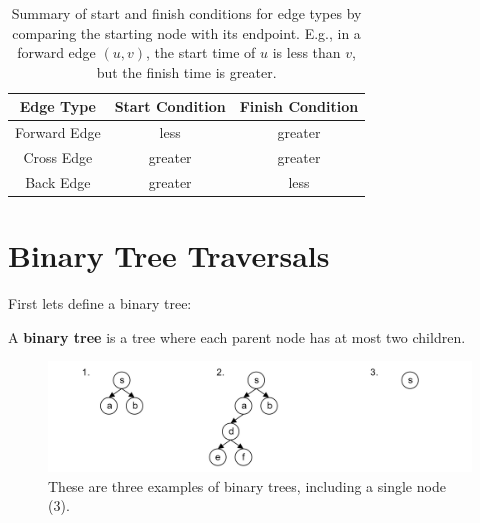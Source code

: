 \begin{table}[h]
    \centering
    \begin{tabular}{|c|c|c|}
        \hline
        \textbf{Edge Type} & \textbf{Start Condition} & \textbf{Finish Condition} \\ \hline
        Forward Edge & less & greater \\ \hline
        Cross Edge & greater & greater \\ \hline
        Back Edge & greater & less \\ \hline
    \end{tabular}
    \caption{Summary of start and finish conditions for edge types by comparing the starting node 
    with its endpoint. E.g., in a forward edge $(u, v)$, the start time of $u$ is less than $v$, but the finish time is greater.}
    \label{tab:edge_timestamps}
\end{table}

\newpage 

\section{Binary Tree Traversals}

\noindent
First lets define a binary tree:
\begin{Def}

    A \textbf{binary tree} is a tree where each parent node has at most two children.
\end{Def}

\begin{figure}[h]
    \begin{center}
    \includegraphics[width=\textwidth]{./Sections/graphs/binary_tree.png}
    \end{center}
     \caption{These are three examples of binary trees, including a single node (3).}\label{fig:binary_tree}
  \end{figure}

